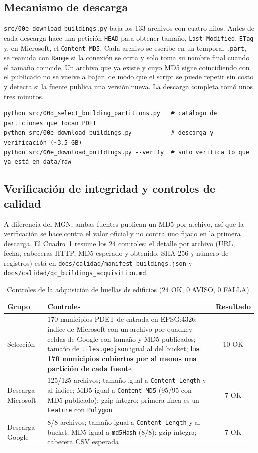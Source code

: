\subsection{Mecanismo de descarga}
\texttt{src/00e\_download\_buildings.py} baja los 133 archivos con cuatro hilos. Antes de cada descarga hace una petición \texttt{HEAD} para obtener tamaño, \texttt{Last-Modified}, \texttt{ETag} y, en Microsoft, el \texttt{Content-MD5}. Cada archivo se escribe en un temporal \texttt{.part}, se reanuda con \texttt{Range} si la conexión se corta y solo toma su nombre final cuando el tamaño coincide. Un archivo que ya existe y cuyo MD5 sigue coincidiendo con el publicado no se vuelve a bajar, de modo que el script se puede repetir sin costo y detecta si la fuente publica una versión nueva. La descarga completa tomó unos tres minutos.

\begin{lstlisting}[style=lab]
python src/00d_select_building_partitions.py   # catálogo de particiones que tocan PDET
python src/00e_download_buildings.py           # descarga y verificación (~3.5 GB)
python src/00e_download_buildings.py --verify  # solo verifica lo que ya está en data/raw
\end{lstlisting}

\subsection{Verificación de integridad y controles de calidad}
A diferencia del MGN, ambas fuentes publican un MD5 por archivo, así que la verificación se hace contra el valor oficial y no contra uno fijado en la primera descarga. El Cuadro~\ref{tab:qc_edificios} resume los 24 controles; el detalle por archivo (URL, fecha, cabeceras HTTP, MD5 esperado y obtenido, SHA-256 y número de registros) está en \texttt{docs/calidad/manifest\_buildings.json} y \texttt{docs/calidad/qc\_buildings\_acquisition.md}.

\begin{table}[H]
\centering
\small
{}
\begin{tabularx}{\textwidth}{l X c}
\toprule
\textbf{Grupo} & \textbf{Controles} & \textbf{Resultado} \\
\midrule
Selección & 170 municipios PDET de entrada en EPSG:4326; índice de Microsoft con un archivo por quadkey; celdas de Google con tamaño y MD5 publicados; tamaño de \texttt{tiles.geojson} igual al del bucket; \textbf{los 170 municipios cubiertos por al menos una partición de cada fuente} & 10 OK \\
Descarga Microsoft & 125/125 archivos; tamaño igual a \texttt{Content-Length} y al índice; MD5 igual a \texttt{Content-MD5} (95/95 con MD5 publicado); gzip íntegro; primera línea es un \texttt{Feature} con \texttt{Polygon} & 7 OK \\
Descarga Google & 8/8 archivos; tamaño igual a \texttt{Content-Length} y al bucket; MD5 igual a \texttt{md5Hash} (8/8); gzip íntegro; cabecera CSV esperada & 7 OK \\
\bottomrule
\end{tabularx}
\caption{Controles de la adquisición de huellas de edificios (24 OK, 0 AVISO, 0 FALLA).}
\label{tab:qc_edificios}
\end{table}

